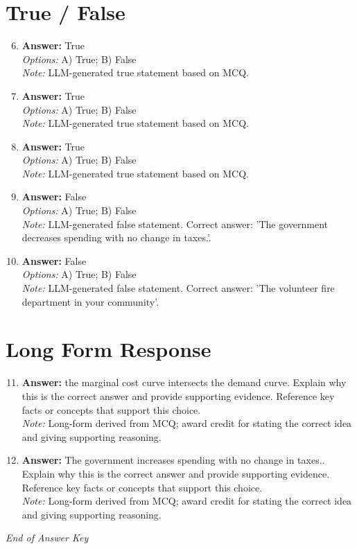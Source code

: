 \documentclass[12pt]{article}
\begin{document}
\section*{True / False}
\begin{enumerate}[label=\arabic*.]
\setcounter{enumi}{5}
\item \textbf{Answer:} True
\\ \textit{Options:} A) True; B) False
\\ \textit{Note:} LLM-generated true statement based on MCQ.
\item \textbf{Answer:} True
\\ \textit{Options:} A) True; B) False
\\ \textit{Note:} LLM-generated true statement based on MCQ.
\item \textbf{Answer:} True
\\ \textit{Options:} A) True; B) False
\\ \textit{Note:} LLM-generated true statement based on MCQ.
\item \textbf{Answer:} False
\\ \textit{Options:} A) True; B) False
\\ \textit{Note:} LLM-generated false statement. Correct answer: 'The government decreases spending with no change in taxes.'.
\item \textbf{Answer:} False
\\ \textit{Options:} A) True; B) False
\\ \textit{Note:} LLM-generated false statement. Correct answer: 'The volunteer fire department in your community'.
\end{enumerate}

\section*{Long Form Response}
\begin{enumerate}[label=\arabic*.]
\setcounter{enumi}{10}
\item \textbf{Answer:} the marginal cost curve intersects the demand curve. Explain why this is the correct answer and provide supporting evidence. Reference key facts or concepts that support this choice.
\\ \textit{Note:} Long-form derived from MCQ; award credit for stating the correct idea and giving supporting reasoning.
\item \textbf{Answer:} The government increases spending with no change in taxes.. Explain why this is the correct answer and provide supporting evidence. Reference key facts or concepts that support this choice.
\\ \textit{Note:} Long-form derived from MCQ; award credit for stating the correct idea and giving supporting reasoning.
\end{enumerate}

\vfill
\noindent\textit{End of Answer Key}
\end{document}

